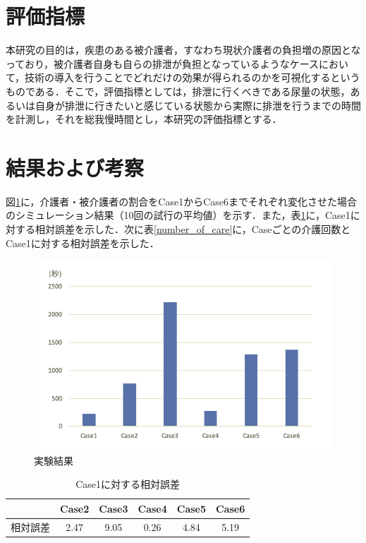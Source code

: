\section{評価指標}

本研究の目的は，疾患のある被介護者，すなわち現状介護者の負担増の原因となっており，被介護者自身も自らの排泄が負担となっているようなケースにおいて，技術の導入を行うことでどれだけの効果が得られるのかを可視化するというものである．そこで，評価指標としては，排泄に行くべきである尿量の状態，あるいは自身が排泄に行きたいと感じている状態から実際に排泄を行うまでの時間を計測し，それを総我慢時間とし，本研究の評価指標とする．

\section{結果および考察}

図\ref{result_v1}に，介護者・被介護者の割合をCase1からCase6までそれぞれ変化させた場合のシミュレーション結果（10回の試行の平均値）を示す．また，表\ref{relative_error}に，Case1に対する相対誤差を示した．次に表\ref{number_of_care}に，Caseごとの介護回数とCase1に対する相対誤差を示した．

\begin{figure}[htb]
\begin{center}
 \includegraphics[scale=0.6]{figures/result_1.png}
 \caption[実験結果]{実験結果 \label{result_v1}}
\end{center}
\end{figure}

\begin{table}[htb]
  \caption[Case1に対する相対誤差]{Case1に対する相対誤差}
  \label{relative_error}
  \centering
  \begin{tabular}{r|c|c|c|c|c}
     & Case2 & Case3 & Case4 & Case5 & Case6 \\ \hline
    相対誤差 & 2.47 & 9.05 & 0.26 & 4.84 & 5.19 \\
    \end{tabular}
\end{table}


